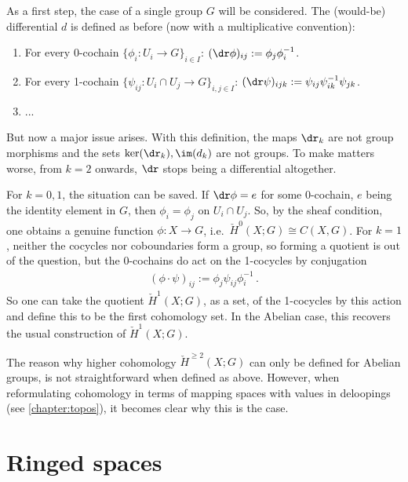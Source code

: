     As a first step, the case of a single group $G$ will be considered. The (would-be) differential $d$ is defined as before (now with a multiplicative convention):
    \begin{enumerate}
        \item For every 0-cochain $\{\phi_i:U_i\rightarrow G\}_{i\in I}$: $(\dr\phi)_{ij}:=\phi_j\phi^{-1}_i$.
        \item For every 1-cochain $\{\psi_{ij}:U_i\cap U_j\rightarrow G\}_{i,j\in I}$: $(\dr\psi)_{ijk} := \psi_{ij}\psi^{-1}_{ik}\psi_{jk}$.
        \item ...
    \end{enumerate}
    But now a major issue arises. With this definition, the maps $\dr_k$ are not group morphisms and the sets $\ker(\dr_k),\im(d_k)$ are not groups. To make matters worse, from $k=2$ onwards, $\dr$ stops being a differential altogether.

    For $k=0,1$, the situation can be saved. If $\dr\phi=e$ for some 0-cochain, $e$ being the identity element in $G$, then $\phi_i=\phi_j$ on $U_i\cap U_j$. So, by the sheaf condition, one obtains a genuine function $\phi:X\rightarrow G$, i.e.~$\check{H}^0(X;G)\cong C(X,G)$. For $k=1$, neither the cocycles nor coboundaries form a group, so forming a quotient is out of the question, but the 0-cochains do act on the 1-cocycles by conjugation
    \begin{gather}
        (\phi\cdot\psi)_{ij} := \phi_j\psi_{ij}\phi^{-1}_i\,.
    \end{gather}
    So one can take the quotient $\check{H}^1(X;G)$, as a set, of the 1-cocycles by this action and define this to be the first cohomology set. In the Abelian case, this recovers the usual construction of $\check{H}^1(X;G)$.

    \begin{remark}
        The reason why higher cohomology $\check{H}^{\geq2}(X;G)$ can only be defined for Abelian groups, is not straightforward when defined as above. However, when reformulating cohomology in terms of mapping spaces with values in deloopings (see \cref{chapter:topos}), it becomes clear why this is the case.
    \end{remark}


\section{Ringed spaces}

